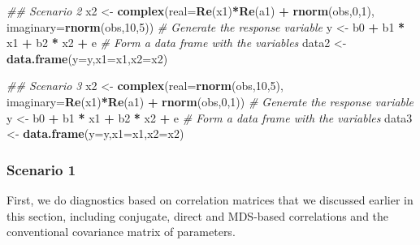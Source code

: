 \documentclass[
]{book}
\newenvironment{Shaded}{\begin{snugshade}}{\end{snugshade}}
\newcommand{\CommentTok}[1]{\textcolor[rgb]{0.56,0.35,0.01}{\textit{#1}}}
\newcommand{\DataTypeTok}[1]{\textcolor[rgb]{0.13,0.29,0.53}{#1}}
\newcommand{\DecValTok}[1]{\textcolor[rgb]{0.00,0.00,0.81}{#1}}
\newcommand{\KeywordTok}[1]{\textcolor[rgb]{0.13,0.29,0.53}{\textbf{#1}}}
\newcommand{\NormalTok}[1]{#1}
\newcommand{\OperatorTok}[1]{\textcolor[rgb]{0.81,0.36,0.00}{\textbf{#1}}}
\newcommand{\StringTok}[1]{\textcolor[rgb]{0.31,0.60,0.02}{#1}}
\begin{document}
\begin{Shaded}
\begin{Highlighting}[]
\CommentTok{\#\# Scenario 2}
\NormalTok{x2 \textless{}{-}}\StringTok{ }\KeywordTok{complex}\NormalTok{(}\DataTypeTok{real=}\KeywordTok{Re}\NormalTok{(x1)}\OperatorTok{*}\KeywordTok{Re}\NormalTok{(a1) }\OperatorTok{+}\StringTok{ }\KeywordTok{rnorm}\NormalTok{(obs,}\DecValTok{0}\NormalTok{,}\DecValTok{1}\NormalTok{),}
              \DataTypeTok{imaginary=}\KeywordTok{rnorm}\NormalTok{(obs,}\DecValTok{10}\NormalTok{,}\DecValTok{5}\NormalTok{))}
\CommentTok{\# Generate the response variable}
\NormalTok{y \textless{}{-}}\StringTok{ }\NormalTok{b0 }\OperatorTok{+}\StringTok{ }\NormalTok{b1 }\OperatorTok{*}\StringTok{ }\NormalTok{x1 }\OperatorTok{+}\StringTok{ }\NormalTok{b2 }\OperatorTok{*}\StringTok{ }\NormalTok{x2 }\OperatorTok{+}\StringTok{ }\NormalTok{e}
\CommentTok{\# Form a data frame with the variables}
\NormalTok{data2 \textless{}{-}}\StringTok{ }\KeywordTok{data.frame}\NormalTok{(}\DataTypeTok{y=}\NormalTok{y,}\DataTypeTok{x1=}\NormalTok{x1,}\DataTypeTok{x2=}\NormalTok{x2)}

\CommentTok{\#\# Scenario 3}
\NormalTok{x2 \textless{}{-}}\StringTok{ }\KeywordTok{complex}\NormalTok{(}\DataTypeTok{real=}\KeywordTok{rnorm}\NormalTok{(obs,}\DecValTok{10}\NormalTok{,}\DecValTok{5}\NormalTok{),}
              \DataTypeTok{imaginary=}\KeywordTok{Re}\NormalTok{(x1)}\OperatorTok{*}\KeywordTok{Re}\NormalTok{(a1) }\OperatorTok{+}\StringTok{ }\KeywordTok{rnorm}\NormalTok{(obs,}\DecValTok{0}\NormalTok{,}\DecValTok{1}\NormalTok{))}
\CommentTok{\# Generate the response variable}
\NormalTok{y \textless{}{-}}\StringTok{ }\NormalTok{b0 }\OperatorTok{+}\StringTok{ }\NormalTok{b1 }\OperatorTok{*}\StringTok{ }\NormalTok{x1 }\OperatorTok{+}\StringTok{ }\NormalTok{b2 }\OperatorTok{*}\StringTok{ }\NormalTok{x2 }\OperatorTok{+}\StringTok{ }\NormalTok{e}
\CommentTok{\# Form a data frame with the variables}
\NormalTok{data3 \textless{}{-}}\StringTok{ }\KeywordTok{data.frame}\NormalTok{(}\DataTypeTok{y=}\NormalTok{y,}\DataTypeTok{x1=}\NormalTok{x1,}\DataTypeTok{x2=}\NormalTok{x2)}
\end{Highlighting}
\end{Shaded}

\hypertarget{scenario-1}{%
\subsubsection*{Scenario 1}\label{scenario-1}}

First, we do diagnostics based on correlation matrices that we discussed earlier in this section, including conjugate, direct and MDS-based correlations and the conventional covariance matrix of parameters.
\end{document}
